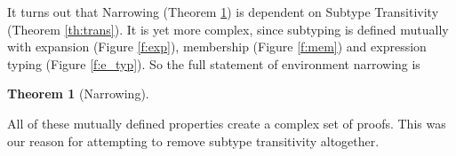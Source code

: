\documentclass[11pt
              , a4paper
              , twoside
              , openright
              ]{report}
\newtheorem{theorem}{Theorem}
\numberwithin{case}{theorem}
\numberwithin{subcase}{case}
\begin{document}
It turns out that Narrowing (Theorem \ref{th:narrow}) is dependent on Subtype Transitivity (Theorem \ref{th:trans}). It is yet more complex, since subtyping is defined mutually with expansion (Figure \ref{f:exp}), membership (Figure \ref{f:mem}) and expression typing (Figure \ref{f:e_typ}). So the full statement of environment narrowing is 
\begin{theorem}[Narrowing]\label{th:narrow}
\end{theorem}
All of these mutually defined properties create a complex set of proofs. This was our reason for attempting to remove subtype transitivity altogether.
\end{document}
